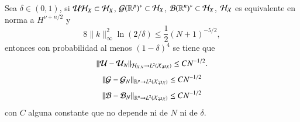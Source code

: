 \begin{teo}
    Sea $\delta \in (0, 1)$, si $\mathcal{U} \mathcal{H}_X \subset \mathcal{H}_X$, $\mathcal{G} (\mathbb{R}^p)^* \subset \mathcal{H}_X$, $\mathcal{B} (\mathbb{R}^n)^* \subset \mathcal{H}_X$, $\mathcal{H}_{\mathcal{X}}$ es equivalente en norma a $H^{\nu + n/2}$ y 
    \[
    8\|k\|^2_\infty \ln(2/\delta) \leq \frac{1}{2} (N+1)^{-5/2},
    \]
    entonces con probabilidad al menos $(1-\delta)^4$ se tiene que
     \begin{equation*}
        \| \mathcal{U} - \mathcal{U}_N \|_{\mathcal{H}_{\mathcal{X}, N} \to L^2(\mathcal{X}; \mu_{\mathcal{X}})} \leq C N^{-1/2}.
    \end{equation*}
    \begin{equation*}
    \| \mathcal{G} - \mathcal{G}_N \|_{\mathbb{R}^p \to L^2(\mathcal{X}; \mu_{\mathcal{X}})} \leq C N^{-1/2}
    \end{equation*}
    \begin{equation*}
    \| \mathcal{B} - \mathcal{B}_N \|_{\mathbb{R}^n \to L^2(\mathcal{X}; \mu_{\mathcal{X}})} \leq C N^{-1/2}
    \end{equation*}
    con $C$ alguna constante que no depende ni de $N$ ni de $\delta$.
\end{teo}


